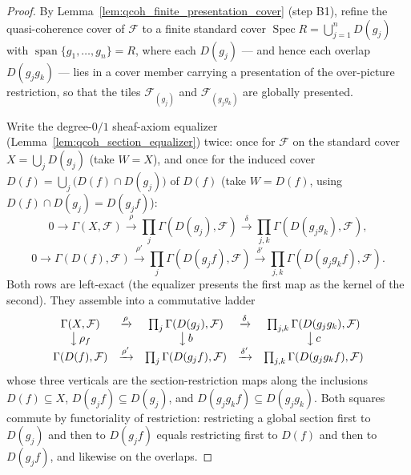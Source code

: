 \begin{proof}
    \leanok
  By Lemma~\ref{lem:qcoh_finite_presentation_cover} (step B1), refine the quasi-coherence cover of
  \(\mathcal{F}\) to a finite standard cover \(\operatorname{Spec} R = \bigcup_{j=1}^{n} D(g_j)\) with
  \(\operatorname{span}\{g_1, \ldots, g_n\} = R\), where each \(D(g_j)\) — and hence each overlap
  \(D(g_j g_k)\) — lies in a cover member carrying a presentation of the over-picture restriction, so
  that the tiles \(\mathcal{F}_{(g_j)}\) and \(\mathcal{F}_{(g_j g_k)}\) are globally presented.

  Write the degree-\(0/1\) sheaf-axiom equalizer (Lemma~\ref{lem:qcoh_section_equalizer}) twice: once for
  \(\mathcal{F}\) on the standard cover \(X = \bigcup_j D(g_j)\) (take \(W = X\)), and once for the induced
  cover \(D(f) = \bigcup_j \bigl(D(f) \cap D(g_j)\bigr)\) of \(D(f)\) (take \(W = D(f)\), using
  \(D(f) \cap D(g_j) = D(g_j f)\)):
  \[
    0 \to \Gamma(X, \mathcal{F}) \xrightarrow{\rho} \prod_j \Gamma(D(g_j), \mathcal{F})
      \xrightarrow{\delta} \prod_{j,k} \Gamma(D(g_j g_k), \mathcal{F}),
  \]
  \[
    0 \to \Gamma(D(f), \mathcal{F}) \xrightarrow{\rho'} \prod_j \Gamma(D(g_j f), \mathcal{F})
      \xrightarrow{\delta'} \prod_{j,k} \Gamma(D(g_j g_k f), \mathcal{F}).
  \]
  Both rows are left-exact (the equalizer presents the first map as the kernel of the second). They
  assemble into a commutative ladder
  \[
    \begin{array}{ccccc}
      \Gamma(X, \mathcal{F}) & \xrightarrow{\rho} & \prod_j \Gamma(D(g_j), \mathcal{F})
        & \xrightarrow{\delta} & \prod_{j,k} \Gamma(D(g_j g_k), \mathcal{F}) \\
      \big\downarrow{\,\rho_f} & & \big\downarrow{\,b} & & \big\downarrow{\,c} \\
      \Gamma(D(f), \mathcal{F}) & \xrightarrow{\rho'} & \prod_j \Gamma(D(g_j f), \mathcal{F})
        & \xrightarrow{\delta'} & \prod_{j,k} \Gamma(D(g_j g_k f), \mathcal{F})
    \end{array}
  \]
  whose three verticals are the section-restriction maps along the inclusions \(D(f) \subseteq X\),
  \(D(g_j f) \subseteq D(g_j)\), and \(D(g_j g_k f) \subseteq D(g_j g_k)\). Both squares commute by
  functoriality of restriction: restricting a global section first to \(D(g_j)\) and then to
  \(D(g_j f)\) equals restricting first to \(D(f)\) and then to \(D(g_j f)\), and likewise on the
  overlaps.


\end{proof}
